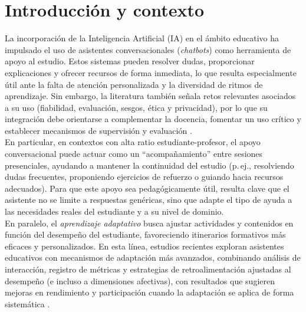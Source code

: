 \documentclass[a4paper,12pt,twoside,final]{book}
\makeatletter
\def\cleardoublepage{\clearpage\if@twoside \ifodd\c@page\else
\hbox{}
\thispagestyle{empty}
\newpage
\if@twocolumn\hbox{}\newpage\fi\fi\fi}
\makeatother
\begin{document}
\clearpage

\thispagestyle{empty}
\pagecolor{white}

\cleardoublepage

\pagestyle{empty}
\tableofcontents
\listoffigures
\listoftables

\mainmatter

\pagestyle{fancy}

\chapter{Introducción y contexto}
\label{cap:introduccion}

La incorporación de la Inteligencia Artificial (IA) en el ámbito educativo ha impulsado el uso de asistentes conversacionales (\textit{chatbots}) como herramienta de apoyo al estudio. Estos sistemas pueden resolver dudas, proporcionar explicaciones y ofrecer recursos de forma inmediata, lo que resulta especialmente útil ante la falta de atención personalizada y la diversidad de ritmos de aprendizaje. Sin embargo, la literatura también señala retos relevantes asociados a su uso (fiabilidad, evaluación, sesgos, ética y privacidad), por lo que su integración debe orientarse a complementar la docencia, fomentar un uso crítico y establecer mecanismos de supervisión y evaluación \cite{Labadze2023}.\\

En particular, en contextos con alta ratio estudiante-profesor, el apoyo conversacional puede actuar como un ``acompañamiento'' entre sesiones presenciales, ayudando a mantener la continuidad del estudio (p.\,ej., resolviendo dudas frecuentes, proponiendo ejercicios de refuerzo o guiando hacia recursos adecuados). Para que este apoyo sea pedagógicamente útil, resulta clave que el asistente no se limite a respuestas genéricas, sino que adapte el tipo de ayuda a las necesidades reales del estudiante y a su nivel de dominio.\\

En paralelo, el \textit{aprendizaje adaptativo} busca ajustar actividades y contenidos en función del desempeño del estudiante, favoreciendo itinerarios formativos más eficaces y personalizados. En esta línea, estudios recientes exploran asistentes educativos con mecanismos de adaptación más avanzados, combinando análisis de interacción, registro de métricas y estrategias de retroalimentación ajustadas al desempeño (e incluso a dimensiones afectivas), con resultados que sugieren mejoras en rendimiento y participación cuando la adaptación se aplica de forma sistemática \cite{Gutierrez2025}.\\
\end{document}
